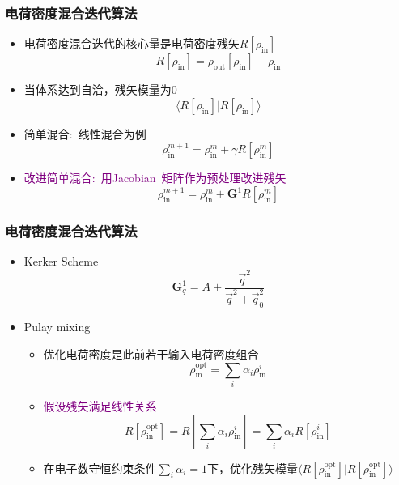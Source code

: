 \documentclass[cjk,slidestop,compress,mathserif,blue]{beamer}
\begin{document}
  \frame
  {
	  \frametitle{电荷密度混合迭代算法}
	  \begin{itemize}
		  \item 电荷密度混合迭代的核心量是电荷密度残矢$R[\rho_{\mathrm{in}}]$
			  \begin{displaymath}
				  R[\rho_{\mathrm{in}}]=\rho_{\mathrm{out}}[\rho_{\mathrm{in}}]-\rho_{\mathrm{in}}
			  \end{displaymath}
		  \item 当体系达到自洽，残矢模量为0
			  \begin{displaymath}
				  \langle R[\rho_{\mathrm{in}}]|R[\rho_{\mathrm{in}}]\rangle
			  \end{displaymath}
		  \item 简单混合:~线性混合为例
			  \begin{displaymath}
				  \rho_{\mathrm{in}}^{m+1}=\rho_{\mathrm{in}}^m+\gamma R[\rho_{\mathrm{in}}^m]
			  \end{displaymath}
		  \item \textcolor{purple}{改进简单混合:~用\textrm{Jacobian~}矩阵作为预处理改进残矢}
			  \begin{displaymath}
				  \rho_{\mathrm{in}}^{m+1}=\rho_{\mathrm{in}}^m+\mathbf{G}^1R[\rho_{\mathrm{in}}^m]
			  \end{displaymath}

	  \end{itemize}
  }

  \frame
  {
	  \frametitle{电荷密度混合迭代算法}
	  \begin{itemize}
		  \item \textrm{Kerker Scheme}
			  \begin{displaymath}
				  \mathbf{G}_q^1=A+\dfrac{\vec q^2}{\vec q^2+\vec q_0^2}
			  \end{displaymath}
		  \item \textrm{Pulay mixing}
			  \begin{itemize}
				  \item 优化电荷密度是此前若干输入电荷密度组合
					  \begin{displaymath}
						  \rho_{\mathrm{in}}^{\mathrm{opt}}=\sum_i\alpha_i\rho_{\mathrm{in}}^i
					  \end{displaymath}
				  \item \textcolor{purple}{假设残矢满足线性关系}
					  \begin{displaymath}
						  R[\rho_{\mathrm{in}}^{\mathrm{opt}}]=R[\sum_i\alpha_i\rho_{\mathrm{in}}^i]=\sum_i\alpha_iR[\rho_{\mathrm{in}}^i]
					  \end{displaymath}
					  \item 在电子数守恒约束条件$\sum\limits_i\alpha_i=1$下，优化残矢模量$\langle R[\rho_{\mathrm{in}}^{\mathrm{opt}}]|R[\rho_{\mathrm{in}}^{\mathrm{opt}}]\rangle$
			  \end{itemize}
	  \end{itemize}
  }
\end{document}

